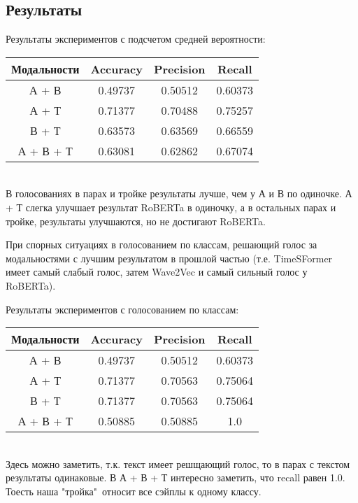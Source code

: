 \documentclass[PMI,VKR]{HSEUniversity}
\begin{document}
\subsection{Результаты}

Результаты экспериментов с подсчетом средней вероятности: \\

\begin{center}
\begin{tabular}{ |c||c|c|c| }
     \hline
      Модальности & Accuracy & Precision & Recall \\
     \hline
      А + В & 0.49737 & 0.50512 & 0.60373 \\
      А + Т & 0.71377 & 0.70488 & 0.75257 \\
      В + Т & 0.63573 & 0.63569 & 0.66559 \\
      А + В + Т & 0.63081 & 0.62862 & 0.67074 \\
     \hline
\end{tabular} 
\end{center} \\

В голосованиях в парах и тройке результаты лучше, чем у А и В по одиночке.
А + Т слегка улучшает результат RoBERTa в одиночку, а в остальных парах и тройке, результаты улучшаются, но не достигают RoBERTa.


При спорных ситуациях в голосованием по классам, решающий голос за модальностями с лучшим результатом в прошлой частью (т.е. TimeSFormer имеет самый слабый голос, затем Wave2Vec и самый сильный голос у RoBERTa).

Результаты экспериментов с голосованием по классам: \\

\begin{center}
\begin{tabular}{ |c||c|c|c|}
     \hline
      Модальности & Accuracy & Precision & Recall \\
     \hline
      А + В & 0.49737 & 0.50512 & 0.60373 \\
      А + Т & 0.71377 & 0.70563 & 0.75064 \\
      В + Т & 0.71377 & 0.70563 & 0.75064 \\
      А + В + Т & 0.50885 & 0.50885 & 1.0 \\
    \hline
\end{tabular}
\end{center} \\

Здесь можно заметить, т.к. текст имеет решщающий голос, то в парах с текстом результаты одинаковые. 
В А + В + Т интересно заметить, что recall равен 1.0. Тоесть наша "тройка"\ относит все сэйплы к одному классу.
\end{document}
